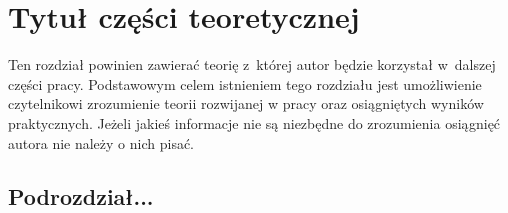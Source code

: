 \chapter{Tytuł części teoretycznej}\label{chap:teoria}
Ten rozdział powinien zawierać teorię z~której autor będzie korzystał w~dalszej
części pracy.  Podstawowym celem istnieniem tego rozdziału jest umożliwienie
czytelnikowi zrozumienie teorii rozwijanej w pracy oraz osiągniętych wyników
praktycznych.  Jeżeli jakieś informacje nie są niezbędne do zrozumienia
osiągnięć autora nie należy o nich pisać.

\section{Podrozdział...}
